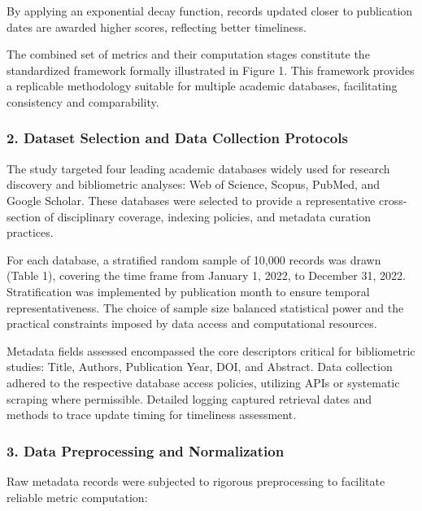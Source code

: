 \documentclass[
  12pt,
]{article}
\begin{document}
By applying an exponential decay function, records updated closer to
publication dates are awarded higher scores, reflecting better
timeliness.

The combined set of metrics and their computation stages constitute the
standardized framework formally illustrated in Figure 1. This framework
provides a replicable methodology suitable for multiple academic
databases, facilitating consistency and comparability.

\subsubsection{2. Dataset Selection and Data Collection
Protocols}\label{dataset-selection-and-data-collection-protocols}

The study targeted four leading academic databases widely used for
research discovery and bibliometric analyses: Web of Science, Scopus,
PubMed, and Google Scholar. These databases were selected to provide a
representative cross-section of disciplinary coverage, indexing
policies, and metadata curation practices.

For each database, a stratified random sample of 10,000 records was
drawn (Table 1), covering the time frame from January 1, 2022, to
December 31, 2022. Stratification was implemented by publication month
to ensure temporal representativeness. The choice of sample size
balanced statistical power and the practical constraints imposed by data
access and computational resources.

Metadata fields assessed encompassed the core descriptors critical for
bibliometric studies: Title, Authors, Publication Year, DOI, and
Abstract. Data collection adhered to the respective database access
policies, utilizing APIs or systematic scraping where permissible.
Detailed logging captured retrieval dates and methods to trace update
timing for timeliness assessment.

\subsubsection{3. Data Preprocessing and
Normalization}\label{data-preprocessing-and-normalization}

Raw metadata records were subjected to rigorous preprocessing to
facilitate reliable metric computation:
\end{document}
